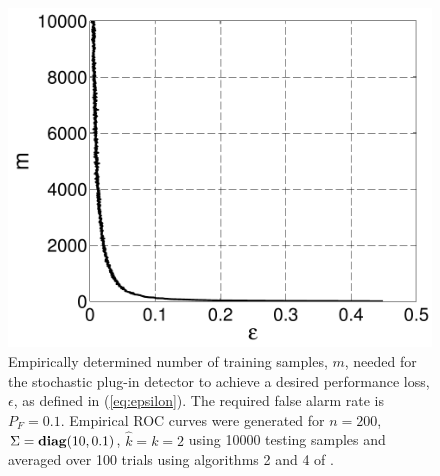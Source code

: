 \begin{figure}[t]
\centering
\includegraphics[width=\figwidth]{ieee_msd/figures/asend2.pdf}
\vspace{-0.1in}
\caption{Empirically determined number of training samples, $m$,  needed for the stochastic plug-in detector to achieve a desired performance loss, $\epsilon$, as defined in (\ref{eq:epsilon}). The required false alarm rate is $P_F=0.1$. Empirical ROC curves were generated for $n=200$, $\Sigma=\mathop{\bf diag}(10,0.1)$, $\widehat{k}=k=2$ using 10000 testing samples and averaged over 100 trials using algorithms 2 and 4 of \cite{fawcett2006introduction}.}
\label{fig:epsilon_graph}
\vspace{-0.3in}
\end{figure}
